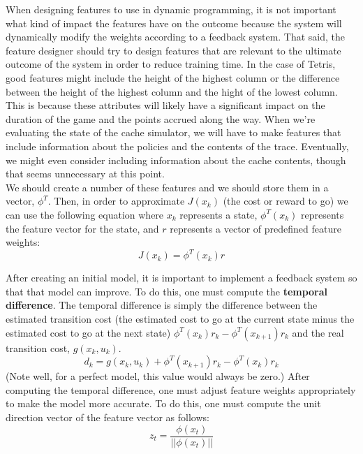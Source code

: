 \documentclass[11pt]{article}
\numberwithin{figure}{section}
\begin{document}
		When designing features to use in dynamic programming, it is not important what kind of impact the features have on the outcome because the system will dynamically modify the weights according to a feedback system. That said, the feature designer should try to design features that are relevant to the ultimate outcome of the system in order to reduce training time. In the case of Tetris, good features might include the height of the highest column or the difference between the height of the highest column and the hight of the lowest column. This is because these attributes will likely have a significant impact on the duration of the game and the points accrued along the way. When we're evaluating the state of the cache simulator, we will have to make features that include information about the policies and the contents of the trace. Eventually, we might even consider including information about the cache contents, though that seems unnecessary at this point. \\
		
		We should create a number of these features and we should store them in a vector, \begin{math}\phi^T\end{math}. Then, in order to approximate \begin{math}J(x_k)\end{math} (the cost or reward to go) we can use the following equation where \begin{math}x_k\end{math} represents a state, \begin{math}\phi^T(x_k)\end{math} represents the feature vector for the state, and \begin{math}r\end{math} represents a vector of predefined feature weights:
		\begin{equation}
			J(x_k) = \phi^T(x_k)r
		\end{equation}
		
		After creating an initial model, it is important to implement a feedback system so that that model can improve. To do this, one must compute the \textbf{temporal difference}. The temporal difference is simply the difference between the estimated transition cost (the estimated cost to go at the current state minus the estimated cost to go at the next state) \begin{math}\phi^T(x_k)r_k - \phi^T(x_{k+1})r_k\end{math} and the real transition cost, \begin{math}g(x_k,u_k)\end{math}.
		\begin{equation}
		d_k=g(x_k,u_k)+\phi^T(x_{k+1})r_k-\phi^T(x_k)r_k
		\end{equation}
		(Note well, for a perfect model, this value would always be zero.)
		After computing the temporal difference, one must adjust feature weights appropriately to make the model more accurate. To do this, one must compute the unit direction vector of the feature vector as follows:
		\begin{equation}
		z_t=\frac{\phi(x_t)}{||\phi(x_t)||}
		\end{equation}
		
\end{document}
